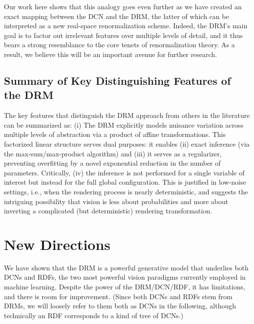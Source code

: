 \documentclass[12pt]{article}
\begin{document}
Our work here shows that this analogy goes even further as we have created an exact mapping between the DCN and the DRM, the latter of which can be interpreted as a new real-space renormalization scheme. 
Indeed, the DRM's main goal is to factor out irrelevant features over multiple levels of detail, and it thus bears a strong resemblance to the core tenets of renormalization theory. As a result, we believe this will be an important avenue for further research. 

\subsection{Summary of Key Distinguishing Features of the DRM}

The key features that distinguish the DRM approach from others in the literature can be summarized as:
(i) The DRM explicitly models nuisance variation across multiple levels of abstraction via a product of affine transformations. This factorized linear structure serves dual purposes: it enables (ii) exact inference (via the max-sum/max-product algorithm) and (iii) it serves as a regularizer, preventing overfitting by a novel exponential reduction in the number of parameters. 
Critically, (iv) the inference is not performed for a single variable of interest but instead for the full global configuration. This is justified in low-noise settings, i.e., when the rendering process is nearly deterministic, and suggests the intriguing possibility that vision is less about probabilities and more about inverting a complicated (but deterministic) rendering transformation.

\section{New Directions} 
\label{sec:ext}

We have shown that the DRM is a powerful generative model that underlies both DCNs and RDFs, the two most powerful vision paradigms currently employed in machine learning. 
Despite the power of the DRM/DCN/RDF, it has limitations, and there is room for improvement. 
(Since both DCNs and RDFs stem from DRMs, we will loosely refer to them both as DCNs in the following, although technically an RDF corresponds to a kind of tree of DCNs.)
\end{document}
